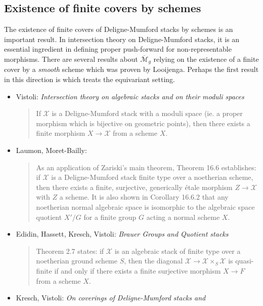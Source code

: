 \subsection{Existence of finite covers by schemes}
\label{subsection-finite-covers}

\noindent
The existence of finite covers of Deligne-Mumford stacks by schemes
is an important result. In intersection theory on Deligne-Mumford
stacks, it is an essential ingredient in defining proper push-forward
for non-representable morphisms. There are several
results about $\overline{\mathcal{M}}_g$ relying on the existence of a finite
cover by a \emph{smooth} scheme which was proven by Looijenga. Perhaps the
first result in this direction is \cite[Theorem 6.1]{seshadri_quotients}
which treats the equivariant setting.
\begin{itemize}
\item Vistoli: \emph{Intersection theory on algebraic stacks and on their
moduli spaces} \cite{vistoli_intersection}
\begin{quote}
If $\mathcal{X}$ is a Deligne-Mumford stack with a moduli space (ie. a proper
morphism
which is bijective on geometric points), then there exists a finite morphism
$X \to \mathcal{X}$ from a scheme $X$.
\end{quote}
\item Laumon, Moret-Bailly: \cite[Chapter 16]{LM-B}
\begin{quote}
As an application of Zariski's main theorem, Theorem 16.6 establishes: if
$\mathcal{X}$ is a Deligne-Mumford stack finite type over a noetherian scheme,
then
there exists a finite, surjective, generically \'etale morphism $Z \to
\mathcal{X}$
with $Z$ a scheme. It is also shown in Corollary 16.6.2 that any noetherian
normal algebraic space is isomorphic to the algebraic space quotient $X'/G$
for a finite group $G$ acting a normal scheme $X$.
\end{quote}
\item Edidin, Hassett, Kresch, Vistoli:
\emph{Brauer Groups and Quotient stacks} \cite{ehkv}
\begin{quote}
Theorem 2.7 states:
if $\mathcal{X}$ is an algebraic stack of finite type over a
noetherian ground scheme $S$, then the diagonal
$\mathcal{X} \to \mathcal{X} \times_S \mathcal{X}$ is
quasi-finite if and only if there exists a finite surjective
morphism $X \to F$ from a scheme $X$.
\end{quote}
\item Kresch, Vistoli: \emph{On coverings of Deligne-Mumford stacks and
}
\end{itemize}
